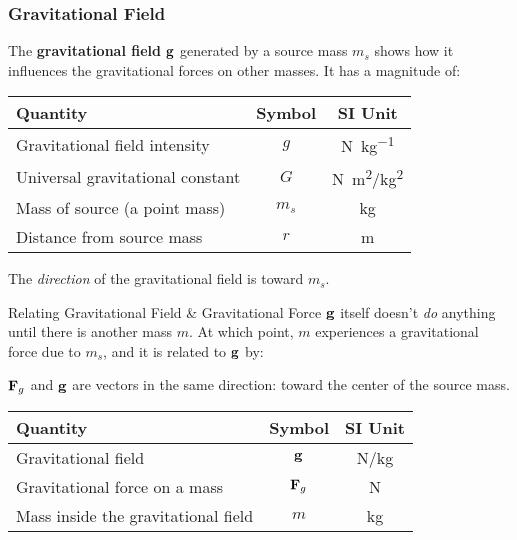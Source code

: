 \documentclass[12pt,compress,aspectratio=169]{beamer}
\newcommand{\mb}[1]{\ensuremath\mathbf{#1}}
\newcommand{\eq}[2]{\vspace{#1}{\Large\begin{displaymath}#2\end{displaymath}}}
\begin{document}
\begin{frame}
  \frametitle{Gravitational Field}
  The \textbf{gravitational field} $\mb{g}$ generated by a source mass $m_s$
  shows how it influences the gravitational forces on other masses. It has a
  magnitude of:

  \eq{-.2in}{
    \boxed{g(m_s,r)=\frac{Gm_s}{r^2}}
  }
  \begin{center}
    \begin{tabular}{l|c|c}
      \rowcolor{pink}
      \textbf{Quantity} & \textbf{Symbol} & \textbf{SI Unit} \\ \hline
      Gravitational field intensity & $g$ & \si{\newton\per\kilo\gram}\\
      Universal gravitational constant & $G$ &
      \si{\newton\metre^2/\kilo\gram^2} \\
      Mass of source (a point mass) & $m_s$ & \si{\kilo\gram} \\
      Distance from source mass     & $r$ & \si{\metre}
    \end{tabular}
  \end{center}

  The \emph{direction} of the gravitational field is toward $m_s$.
\end{frame}



\begin{frame}{Relating Gravitational Field \& Gravitational Force}
  $\mb{g}$ itself doesn't \emph{do} anything until there is another mass $m$. At
  which point, $m$ experiences a gravitational force due to $m_s$, and it is
  related to $\mb{g}$ by:

  \eq{-.2in}{
    \boxed{\mb{F}=m\mb{g}}
  }
  
  $\mb{F}_g$ and  $\mb{g}$ are vectors in the same direction: toward the
  center of the source mass.
  \begin{center}
    \begin{tabular}{l|c|c}
      \rowcolor{pink}
      \textbf{Quantity} & \textbf{Symbol} & \textbf{SI Unit} \\ \hline
      Gravitational field & $\mb{g}$   & \si{N/kg}\\
      Gravitational force on a mass & $\mb{F}_g$ & \si{\newton} \\
      Mass inside the gravitational field & $m$ & \si{\kilo\gram}
    \end{tabular}
  \end{center}
\end{frame}
\end{document}
